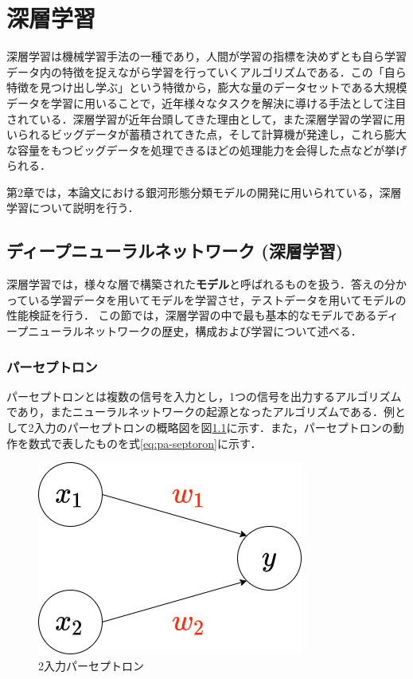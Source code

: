 \documentclass[a4j, 11pt]{jreport}
\begin{document}
\newpage
\chapter{深層学習}
深層学習は機械学習手法の一種であり，人間が学習の指標を決めずとも自ら学習データ内の特徴を捉えながら学習を行っていくアルゴリズムである．この「自ら特徴を見つけ出し学ぶ」という特徴から，膨大な量のデータセットである大規模データを学習に用いることで，近年様々なタスクを解決に導ける手法として注目されている．深層学習が近年台頭してきた理由として，また深層学習の学習に用いられるビッグデータが蓄積されてきた点，そして計算機が発達し，これら膨大な容量をもつビッグデータを処理できるほどの処理能力を会得した点などが挙げられる．

第2章では，本論文における銀河形態分類モデルの開発に用いられている，深層学習について説明を行う．

\section{ディープニューラルネットワーク (深層学習)}
深層学習では，様々な層で構築された\textbf{モデル}と呼ばれるものを扱う．答えの分かっている学習データを用いてモデルを学習させ，テストデータを用いてモデルの性能検証を行う．
この節では，深層学習の中で最も基本的なモデルであるディープニューラルネットワークの歴史，構成および学習について述べる．

\subsection{パーセプトロン}
パーセプトロンとは複数の信号を入力とし，1つの信号を出力するアルゴリズムであり，またニューラルネットワークの起源となったアルゴリズムである．例として2入力のパーセプトロンの概略図を図\ref{fig:pa-septoron}に示す．また，パーセプトロンの動作を数式で表したものを式\ref{eq:pa-septoron}に示す．

\begin{figure}[H]
  \centering
  \includegraphics[width=0.50\hsize, keepaspectratio]{images/drawio/pa-seputoron.png}
  \caption{2入力パーセプトロン}
  \label{fig:pa-septoron}
 \end{figure}
\end{document}
